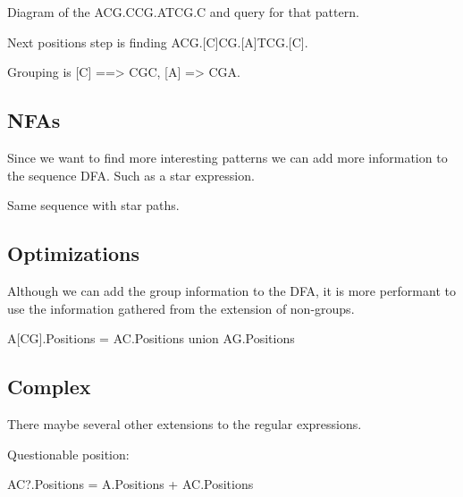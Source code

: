 Diagram of the ACG.CCG.ATCG.C and query for that pattern.

Next positions step is finding ACG.[C]CG.[A]TCG.[C].

Grouping is [C] ==> CGC, [A] => CGA.


\subsection{NFAs}

Since we want to find more interesting patterns we can add more
information to the sequence DFA. Such as a star expression.

Same sequence with star paths.


\subsection{Optimizations}

Although we can add the group information to the DFA, it is more
performant to use the information gathered from the extension
of non-groups.

A[CG].Positions = AC.Positions union AG.Positions


\subsection{Complex}

There maybe several other extensions to the regular expressions.

Questionable position:

AC?.Positions = A.Positions + AC.Positions

